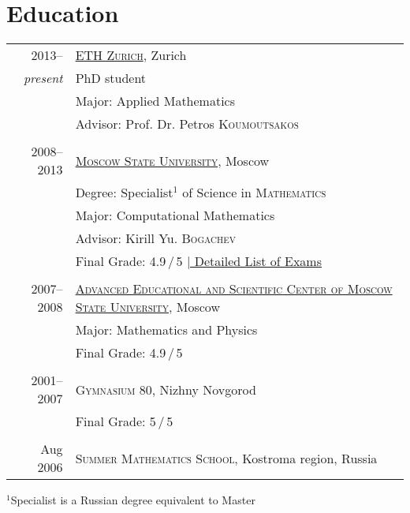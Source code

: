 \documentclass[a4paper,10pt]{article}
\begin{document}
\section{Education}
\begin{tabular}{r|p{13cm}}
 2013-- & \href{http://www.ethz.ch}{\textsc{ETH Zurich}}, Zurich\\
  \emph{present} & PhD student \\
                 & Major: Applied Mathematics \\
                 & Advisor: Prof. Dr. Petros \textsc{Koumoutsakos} \\

\multicolumn{2}{c}{} \\

 2008--2013 & \href{http://www.msu.ru/en/}{\textsc{Moscow State University}}, Moscow\\
 & Degree: Specialist$^1\!\!$ of Science in \textsc{Mathematics}\\
 & Major: Computational Mathematics\\
 & Advisor: Kirill Yu. \textsc{Bogachev}\\
 &\normalsize Final Grade: 4.9\,/\,5 \hyperlink{grds}{\hfill | \footnotesize Detailed List of Exams}\\

\multicolumn{2}{c}{} \\

 2007--2008& \href{http://www.aesc.msu.ru/}{\textsc{Advanced Educational and Scientific Center of Moscow State University}}, Moscow \\
 & Major: Mathematics and Physics \\
 &Final Grade: 4.9\,/\,5\\

\multicolumn{2}{c}{} \\

 2001--2007& \textsc{Gymnasium 80}, Nizhny Novgorod \\
 & Final Grade: 5\,/\,5\\

\multicolumn{2}{c}{} \\

 Aug 2006 & \textsc{Summer Mathematics School}, Kostroma region, Russia
\end{tabular}
\linebreak

\footnotesize{$^1$Specialist is a Russian degree equivalent to Master} \normalsize

\end{document}
